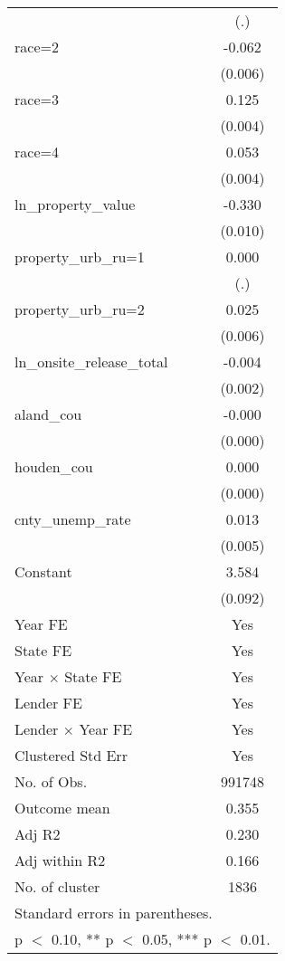 {\begin{longtable}{l*{1}{c}}
                    &         (.)         \\
race=2              &      -0.062\sym{***}\\
                    &     (0.006)         \\
race=3              &       0.125\sym{***}\\
                    &     (0.004)         \\
race=4              &       0.053\sym{***}\\
                    &     (0.004)         \\
ln\_property\_value   &      -0.330\sym{***}\\
                    &     (0.010)         \\
property\_urb\_ru=1   &       0.000         \\
                    &         (.)         \\
property\_urb\_ru=2   &       0.025\sym{***}\\
                    &     (0.006)         \\
ln\_onsite\_release\_total&      -0.004\sym{**} \\
                    &     (0.002)         \\
aland\_cou           &      -0.000         \\
                    &     (0.000)         \\
houden\_cou          &       0.000         \\
                    &     (0.000)         \\
cnty\_unemp\_rate     &       0.013\sym{***}\\
                    &     (0.005)         \\
Constant            &       3.584\sym{***}\\
                    &     (0.092)         \\
\hline
Year FE             &         Yes         \\
State FE            &         Yes         \\
Year $\times$ State FE&         Yes         \\
Lender FE           &         Yes         \\
Lender $\times$ Year FE&         Yes         \\
Clustered Std Err   &         Yes         \\
No. of Obs.         &      991748         \\
Outcome mean        &       0.355         \\
Adj R2              &       0.230         \\
Adj within R2       &       0.166         \\
No. of cluster      &        1836         \\
\hline\hline
\multicolumn{2}{l}{\footnotesize Standard errors in parentheses.}\\
\multicolumn{2}{l}{\footnotesize * p $<$ 0.10, ** p $<$ 0.05, *** p $<$ 0.01.}\\
\end{longtable}
}
